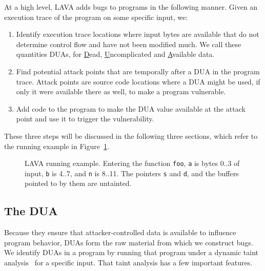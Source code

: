 
At a high level, LAVA adds bugs to programs in the following manner. Given an execution trace of the program on some specific input, we:

\begin {enumerate}
\item Identify execution trace locations where input bytes are available that do not determine control flow and have not been modified much. 
We call these quantities DUAs, for \underline{D}ead, \underline{U}ncomplicated and \underline{A}vailable data.
\item Find potential attack points that are temporally after a DUA in the program trace.
Attack points are source code locations where a DUA might be used, if only it were available there as well, to make a program vulnerable. 
\item Add code to the program to make the DUA value available at the attack point and use it to trigger the vulnerability. 
\end{enumerate}

These three steps will be discussed in the following three sections, which refer to the running example in Figure~\ref{fig:worked-example}.

\begin{figure}

\caption{LAVA running example.  
Entering the function \texttt{foo}, \texttt{a} is bytes 0..3 of input, \texttt{b} is 4..7, and \texttt{n} is 8..11.
The pointers \texttt{s} and \texttt{d}, and the buffers pointed to by them are untainted.}
\label{fig:worked-example}
\end{figure}

\subsection {The DUA}

Because they ensure that attacker-controlled data is available to influence program behavior, DUAs form the raw material from which we construct bugs. 
We identify DUAs in a program by running that program under a dynamic taint analysis~\cite{newsometaint} for a specific input.
That taint analysis has a few important features.

